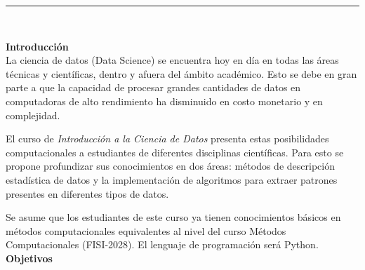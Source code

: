 \documentclass[letterpaper,10pt,onecolumn]{article}
\begin{document}





\noindent\rule{\textwidth}{1pt}\\[-0.1cm]

\addtocounter{mysection}{1}

\noindent\textbf{\large {} \quad Introducci\'on}\\[-0.2cm]


\noindent\normalsize 
La ciencia de datos (Data Science) se encuentra hoy en d\'ia en
todas las \'areas t\'ecnicas y cient\'ificas, dentro y afuera del
\'ambito acad\'emico.
Esto se debe en gran parte a que la capacidad de procesar grandes
cantidades de datos en computadoras de alto  rendimiento ha disminuido
en costo monetario y en complejidad. 

El curso de \textit{Introducci\'on a la Ciencia de Datos}
presenta estas posibilidades computacionales a estudiantes de diferentes disciplinas
cient\'ificas. Para esto se propone profundizar sus conocimientos
en dos \'areas: m\'etodos de descripci\'on estad\'istica de datos y la
implementaci\'on de algoritmos para extraer patrones presentes en
diferentes tipos de datos.

Se asume que los estudiantes de este curso ya tienen conocimientos
b\'asicos en m\'etodos computacionales equivalentes al nivel del curso
M\'etodos Computacionales (FISI-2028).
El lenguaje de programaci\'on ser\'a Python.
\\[0.1cm] 

\noindent\textbf{\large {} \quad Objetivos}\\[-0.2cm]
\end{document}
